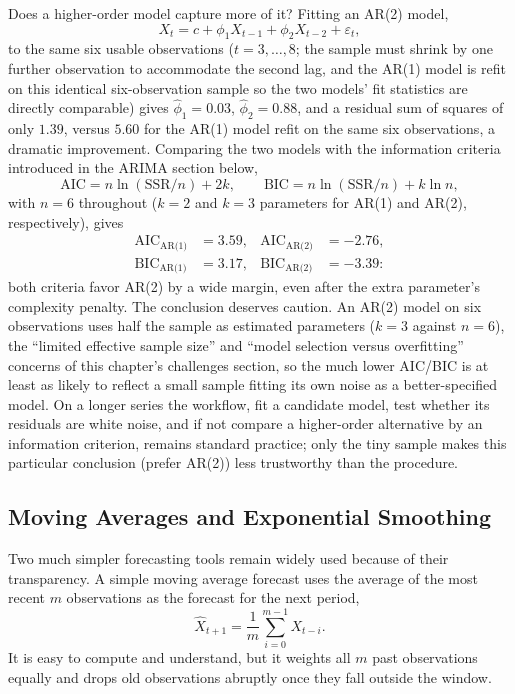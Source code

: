 \documentclass[../ai_in_finance]{subfiles}
\begin{document}
Does a higher-order model capture more of it? Fitting an AR(2) model,
$$X_t = c + \phi_1 X_{t-1} + \phi_2 X_{t-2} + \varepsilon_t,$$
to the same six usable observations ($t=3,\ldots,8$; the sample must shrink by one further observation to accommodate the second lag, and the AR(1) model is refit on this identical six-observation sample so the two models' fit statistics are directly comparable) gives $\hat\phi_1 = 0.03$, $\hat\phi_2 = 0.88$, and a residual sum of squares of only $1.39$, versus $5.60$ for the AR(1) model refit on the same six observations, a dramatic improvement. Comparing the two models with the information criteria introduced in the ARIMA section below,
\begin{equation}
\label{eq:timeseries-aic-bic}
\text{AIC} = n\ln(\text{SSR}/n) + 2k, \qquad \text{BIC} = n\ln(\text{SSR}/n) + k\ln n,
\end{equation}
with $n=6$ throughout ($k=2$ and $k=3$ parameters for AR(1) and AR(2), respectively), gives
\begin{align*}
\text{AIC}_{\text{AR(1)}} &= 3.59, & \text{AIC}_{\text{AR(2)}} &= -2.76, \\
\text{BIC}_{\text{AR(1)}} &= 3.17, & \text{BIC}_{\text{AR(2)}} &= -3.39:
\end{align*}
both criteria favor AR(2) by a wide margin, even after the extra parameter's complexity penalty.
The conclusion deserves caution. An AR(2) model on six observations uses half the sample as estimated parameters ($k=3$ against $n=6$), the ``limited effective sample size'' and ``model selection versus overfitting'' concerns of this chapter's challenges section, so the much lower AIC/BIC is at least as likely to reflect a small sample fitting its own noise as a better-specified model. On a longer series the workflow, fit a candidate model, test whether its residuals are white noise, and if not compare a higher-order alternative by an information criterion, remains standard practice; only the tiny sample makes this particular conclusion (prefer AR(2)) less trustworthy than the procedure.

\subsection{Moving Averages and Exponential Smoothing}
\label{sec:exp-smoothing}

Two much simpler forecasting tools remain widely used because of their transparency. A simple moving average forecast uses the average of the most recent $m$ observations as the forecast for the next period,
\begin{equation*}
\hat X_{t+1} = \frac{1}{m}\sum_{i=0}^{m-1} X_{t-i}.
\end{equation*}
It is easy to compute and understand, but it weights all $m$ past observations equally and drops old observations abruptly once they fall outside the window.
\end{document}
